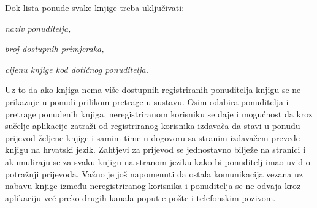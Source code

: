         Dok lista ponude svake knjige treba uključivati:
        \begin{packed_item}
			\item \textit{naziv ponuditelja,}
			\item \textit{broj dostupnih primjeraka,}
			\item \textit{cijenu knjige kod dotičnog ponuditelja.}
		\end{packed_item}
        Uz to da ako knjiga nema više dostupnih registriranih  ponuditelja knjigu se ne prikazuje u ponudi prilikom pretrage u sustavu.
        Osim odabira ponuditelja i pretrage ponuđenih knjiga, neregistriranom korisniku se daje i mogućnost da kroz sučelje aplikacije zatraži od registriranog korisnika izdavača da stavi u ponudu prijevod željene knjige i samim time u dogovoru sa stranim izdavačem prevede knjigu na hrvatski jezik. Zahtjevi za prijevod se jednostavno bilježe na stranici i akumuliraju se za svaku knjigu na stranom jeziku kako bi ponuditelj imao uvid o potražnji prijevoda. Važno je još napomenuti da ostala komunikacija vezana uz nabavu knjige između neregistriranog korisnika i ponuditelja se ne odvaja kroz aplikaciju već preko drugih kanala poput e-pošte i telefonskim pozivom. 
        

